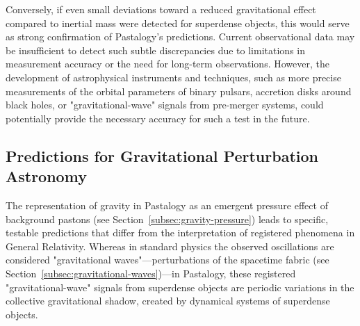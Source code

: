 \documentclass[pdflatex,sn-mathphys-num,referee]{sn-jnl}
\begin{document}
Conversely, if even small deviations toward a reduced gravitational effect compared to inertial mass were detected for superdense objects, this would serve as strong confirmation of Pastalogy's predictions. Current observational data may be insufficient to detect such subtle discrepancies due to limitations in measurement accuracy or the need for long-term observations. However, the development of astrophysical instruments and techniques, such as more precise measurements of the orbital parameters of binary pulsars, accretion disks around black holes, or "gravitational-wave" signals from pre-merger systems, could potentially provide the necessary accuracy for such a test in the future.

\subsection{Predictions for Gravitational Perturbation Astronomy}\label{subsec:gravitational-astronomy}

The representation of gravity in Pastalogy as an emergent pressure effect of background pastons (see Section~\ref{subsec:gravity-pressure}) leads to specific, testable predictions that differ from the interpretation of registered phenomena in General Relativity. Whereas in standard physics the observed oscillations are considered "gravitational waves"---perturbations of the spacetime fabric (see Section~\ref{subsec:gravitational-waves})---in Pastalogy, these registered "gravitational-wave" signals from superdense objects are periodic variations in the collective gravitational shadow, created by dynamical systems of superdense objects.
\end{document}

